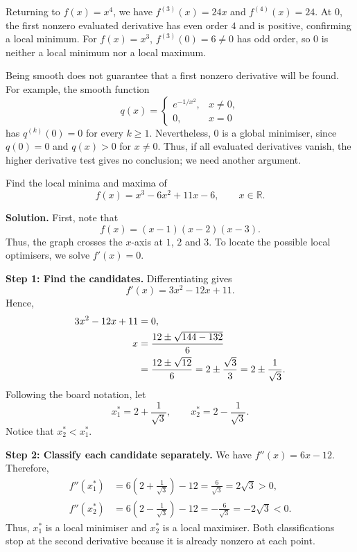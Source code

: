 Returning to $f(x)=x^4$, we have $f^{(3)}(x)=24x$ and $f^{(4)}(x)=24$. At $0$, the first nonzero evaluated derivative has even order $4$ and is positive, confirming a local minimum. For $f(x)=x^3$, $f^{(3)}(0)=6\neq0$ has odd order, so $0$ is neither a local minimum nor a local maximum.

\begin{remark}
	Being smooth does not guarantee that a first nonzero derivative will be found. For example, the smooth function
	\[
		q(x)=\begin{cases}
			e^{-1/x^2}, & x\neq0, \\
			0,          & x=0
		\end{cases}
	\]
	has $q^{(k)}(0)=0$ for every $k\geq1$. Nevertheless, $0$ is a global minimiser, since $q(0)=0$ and $q(x)>0$ for $x\neq0$. Thus, if all evaluated derivatives vanish, the higher derivative test gives no conclusion; we need another argument.
\end{remark}

\begin{example}
	Find the local minima and maxima of
	\begin{equation}
		f(x)=x^3-6x^2+11x-6,
		\qquad x\in\mathbb{R}.
		\label{eq:lec04-cubic}
	\end{equation}
\end{example}

\textbf{Solution.}
First, note that
\[
	f(x)=(x-1)(x-2)(x-3).
\]
Thus, the graph crosses the $x$-axis at $1$, $2$ and $3$. To locate the possible local optimisers, we solve $f'(x)=0$.

\textbf{Step 1: Find the candidates.}
Differentiating gives
\[
	f'(x)=3x^2-12x+11.
\]
Hence,
\begin{align}
	3x^2-12x+11 & =0,\notag                            \\
	x           & =\frac{12\pm\sqrt{144-132}}{6}\notag \\
	            & =\frac{12\pm\sqrt{12}}{6}
	=2\pm\frac{\sqrt{3}}{3}
	=2\pm\frac{1}{\sqrt{3}}.
	\label{eq:lec04-cubic-stationary}
\end{align}
Following the board notation, let
\[
	x_1^*=2+\frac{1}{\sqrt{3}},
	\qquad x_2^*=2-\frac{1}{\sqrt{3}}.
\]
Notice that $x_2^*<x_1^*$.

\textbf{Step 2: Classify each candidate separately.}
We have $f''(x)=6x-12$. Therefore,
\begin{align*}
	f''(x_1^*) & =6\left(2+\frac{1}{\sqrt{3}}\right)-12
	=\frac{6}{\sqrt{3}}=2\sqrt{3}>0,                    \\
	f''(x_2^*) & =6\left(2-\frac{1}{\sqrt{3}}\right)-12
	=-\frac{6}{\sqrt{3}}=-2\sqrt{3}<0.
\end{align*}
Thus, $x_1^*$ is a local minimiser and $x_2^*$ is a local maximiser. Both classifications stop at the second derivative because it is already nonzero at each point.

